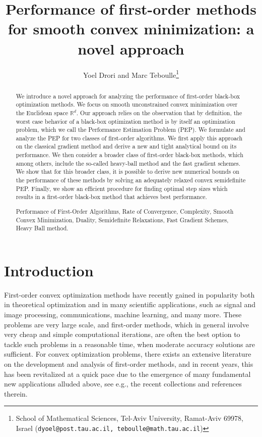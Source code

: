 \documentclass[12pt]{article}
\title{Performance of first-order methods for smooth convex minimization: a novel approach}
\author{Yoel Drori and Marc Teboulle\thanks{School of Mathematical Sciences, Tel-Aviv University, Ramat-Aviv 69978,
Israel ({\tt dyoel@post.tau.ac.il, teboulle@math.tau.ac.il})}}
\numberwithin{equation}{section}
\theoremstyle{definition}
\theoremstyle{remark}
\def\real{\mathbb{R}}
\begin{document}
\maketitle

\begin{abstract}
We introduce a novel approach for analyzing the performance of first-order black-box
optimization methods. We focus on smooth unconstrained convex minimization over the Euclidean
space $\real^d$. Our approach relies on the observation that by definition, the worst case
behavior of a black-box optimization method is by itself an optimization problem, which we
call the Performance Estimation Problem (PEP). We formulate and analyze the PEP for two
classes of first-order algorithms. We first apply this approach on the classical gradient
method and derive a new and tight analytical bound on its performance. We then consider a
broader class of first-order black-box methods, which among others, include the so-called
heavy-ball method and the fast gradient schemes. We show that for this broader class, it is
possible to derive new numerical bounds on the performance of these methods by solving an
adequately relaxed convex semidefinite PEP. Finally, we show an efficient procedure for
finding optimal step sizes  which results in a first-order black-box method that achieves best
performance.
\medskip

 Performance of First-Order Algorithms, Rate of Convergence,
Complexity, Smooth Convex Minimization, Duality, Semidefinite Relaxations, Fast Gradient
Schemes, Heavy Ball method.

\end{abstract}



\section{Introduction}
First-order convex optimization methods have recently gained in popularity both in theoretical
optimization and in many scientific applications, such as signal and image processing,
communications, machine learning, and many more. These problems are very large scale, and
first-order methods, which in general involve very cheap and simple computational iterations,
are often the best option to tackle such problems in a reasonable time, when moderate accuracy
solutions are sufficient. For convex optimization problems, there exists an extensive
literature on the development and analysis of first-order methods, and in recent years, this
has been revitalized at a quick pace due to the emergence of many fundamental new applications
alluded above, see e.g., the recent collections \cite{convex-sig-10, opt-ml-11} and references
therein.
\end{document}
